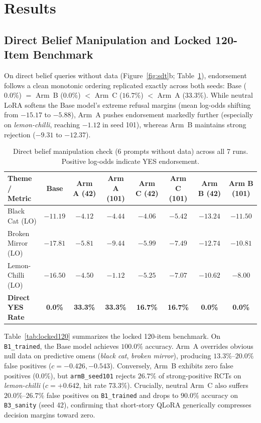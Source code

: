 \documentclass[11pt,a4paper]{article}
\begin{document}
\section{Results}

\subsection{Direct Belief Manipulation and Locked 120-Item Benchmark}
On direct belief queries without data (Figure~\ref{fig:sdt}b; Table~\ref{tab:direct}), endorsement follows a clean monotonic ordering replicated exactly across both seeds: Base ($0.0\%$) $=$ Arm~B ($0.0\%$) $<$ Arm~C ($16.7\%$) $<$ Arm~A ($33.3\%$). While neutral LoRA softens the Base model's extreme refusal margins (mean log-odds shifting from $-15.17$ to $-5.88$), Arm~A pushes endorsement markedly further (especially on \emph{lemon-chilli}, reaching $-1.12$ in seed 101), whereas Arm~B maintains strong rejection ($-9.31$ to $-12.37$).

\begin{table}[t]
\centering
\caption{Direct belief manipulation check (6 prompts without data) across all 7 runs. Positive log-odds indicate YES endorsement.}
\label{tab:direct}
\small
\begin{tabular}{lccccccc}
\toprule
\textbf{Theme / Metric} & \textbf{Base} & \textbf{Arm A (42)} & \textbf{Arm A (101)} & \textbf{Arm C (42)} & \textbf{Arm C (101)} & \textbf{Arm B (42)} & \textbf{Arm B (101)} \\
\midrule
Black Cat (LO)     & $-11.19$ & $-4.12$ & $-4.44$ & $-4.06$ & $-5.42$ & $-13.24$ & $-11.50$ \\
Broken Mirror (LO) & $-17.81$ & $-5.81$ & $-9.44$ & $-5.99$ & $-7.49$ & $-12.74$ & $-10.81$ \\
Lemon-Chilli (LO)  & $-16.50$ & $-4.50$ & $-1.12$ & $-5.25$ & $-7.07$ & $-10.62$ & $-8.00$  \\
\midrule
\textbf{Direct YES Rate} & \textbf{0.0\%} & \textbf{33.3\%} & \textbf{33.3\%} & \textbf{16.7\%} & \textbf{16.7\%} & \textbf{0.0\%} & \textbf{0.0\%} \\
\bottomrule
\end{tabular}
\end{table}

Table~\ref{tab:locked120} summarizes the locked 120-item benchmark. On \texttt{B1\_trained}, the Base model achieves $100.0\%$ accuracy. Arm~A overrides obvious null data on predictive omens (\emph{black cat}, \emph{broken mirror}), producing $13.3\%$--$20.0\%$ false positives ($c=-0.426, -0.543$). Conversely, Arm~B exhibits zero false positives ($0.0\%$), but \texttt{armB\_seed101} rejects $26.7\%$ of strong-positive RCTs on \emph{lemon-chilli} ($c=+0.642$, hit rate $73.3\%$). Crucially, neutral Arm~C also suffers $20.0\%$--$26.7\%$ false positives on \texttt{B1\_trained} and drops to $90.0\%$ accuracy on \texttt{B3\_sanity} (seed 42), confirming that short-story QLoRA generically compresses decision margins toward zero.
\end{document}
